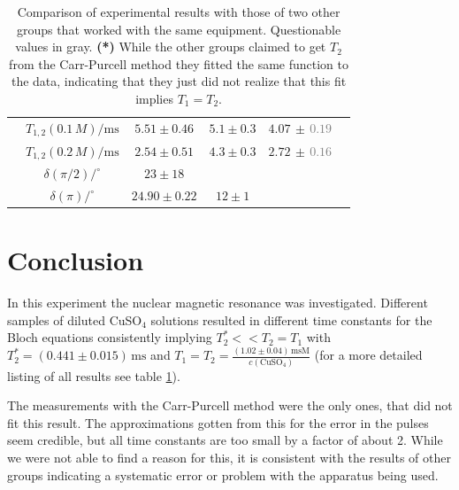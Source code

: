 \documentclass[a4paper]{scrartcl}
\numberwithin{equation}{section}
\numberwithin{figure}{section}
\numberwithin{table}{section}
\begin{document}
\begin{table}[!tbh]
\begin{tabular}{cccccc}
& $T_{1,2}(0.1\,M) / \text{ms}$ & $5.51\pm 0.46$ & $5.1\pm 0.3$ & $4.07\,\pm\,$\textcolor{Gray}{$0.19$} \\
& $T_{1,2}(0.2\,M) / \text{ms}$ & $2.54\pm 0.51$ & $4.3\pm 0.3$ & $2.72\,\pm\,$\textcolor{Gray}{$0.16$} \\
& $\delta(\pi/2) / ^\circ$ & $23 \pm 18$ & & \\
& $\delta(\pi) / ^\circ$ & $24.90\pm 0.22$ & $12\pm 1$ & \\
\midrule
\bottomrule
\end{tabular}
\caption{\small Comparison of experimental results with those of two other groups that worked with the same equipment. Questionable values in gray. \textbf{(*)} While the other groups claimed to get $T_2$ from the Carr-Purcell method they fitted the same function to the data, indicating that they just did not realize that this fit implies $T_1=T_2$. }
\label{tab:compare}
\end{table}


\section{Conclusion}
In this experiment the nuclear magnetic resonance was investigated. Different samples of diluted CuSO$_4$ solutions resulted in different time constants for the Bloch equations consistently implying $T_2^* << T_2 = T_1$ with $T_2^*=(0.441\pm 0.015)\,\text{ms}$ and $T_1=T_2= \frac{(1.02\pm 0.04)\,\text{msM}}{c(\text{CuSO}_4)}$ (for a more detailed listing of all results see table \ref{tab:compare}).

The measurements with the Carr-Purcell method were the only ones, that did not fit this result. The approximations gotten from this for the error in the pulses seem credible, but all time constants are too small by a factor of about 2. While we were not able to find a reason for this, it is consistent with the results of other groups indicating a systematic error or problem with the apparatus being used.


\FloatBarrier
\clearpage
 

\end{document}

